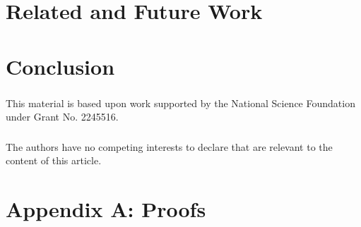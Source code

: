 \documentclass[runningheads]{llncs}
\begin{document}



% 

\section{Related and Future Work} \label{sec-future}

\section{Conclusion} \label{sec-conclusion}

\begin{credits}
\subsubsection{\ackname}
% 
This material is based upon work supported by the National Science Foundation
under Grant No. 2245516.

\subsubsection{\discintname}
%
The authors have no competing interests to declare that are
relevant to the content of this article.
\end{credits}
%
%
%



\section{Appendix A: Proofs}

\end{document}
